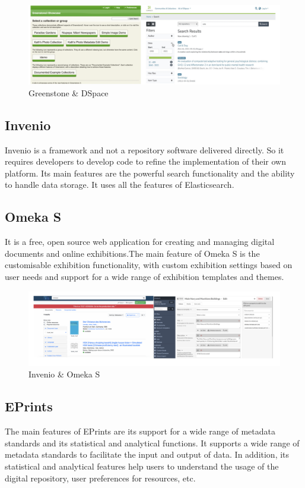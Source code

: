 \begin{figure}[htbp]
  \centerline{\includegraphics[width=500pt]{images/a1.jpg}}
  \caption{Greenstone \& DSpace}
\end{figure}

\subsection{Invenio}

Invenio is a framework and not a repository software delivered directly. So it requires developers to develop code to refine the implementation of their own platform. Its main features are the powerful search functionality and the ability to handle data storage. It uses all the features of Elasticsearch.



\subsection{Omeka S}
It is a free, open source web application for creating and managing digital documents and online exhibitions.The main feature of Omeka S is the customisable exhibition functionality, with custom exhibition settings based on user needs and support for a wide range of exhibition templates and themes\cite{FeatureL22:online}.

\begin{figure}[htbp]
  \centerline{\includegraphics[width=500pt]{images/a9.jpg}}
  \caption{Invenio \& Omeka S}
\end{figure}

\subsection{EPrints}
The main features of EPrints are its support for a wide range of metadata standards and its statistical and analytical functions. It supports a wide range of metadata standards to facilitate the input and output of data. In addition, its statistical and analytical features help users to understand the usage of the digital repository, user preferences for resources, etc.


